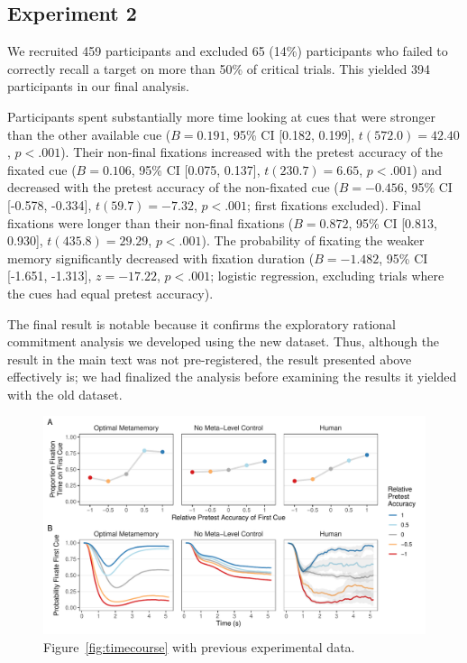 \subsection{Experiment 2}

We recruited 459 participants and excluded 65 (14\%) participants who failed to correctly recall a target on more than 50\% of critical trials. This yielded 394 participants in our final analysis.

Participants spent substantially more time looking at cues that were stronger than the other available cue ($B = 0.191$, 95\% CI [0.182, 0.199], $t(572.0)=42.40$, $p < .001$). Their non-final fixations increased with the pretest accuracy of the fixated cue ($B = 0.106$, 95\% CI [0.075, 0.137], $t(230.7)=6.65$, $p < .001$) and decreased with the pretest accuracy of the non-fixated cue ($B = -0.456$, 95\% CI [-0.578, -0.334], $t(59.7)=-7.32$, $p < .001$; first fixations excluded). Final fixations were longer than their non-final fixations ($B = 0.872$, 95\% CI [0.813, 0.930], $t(435.8)=29.29$, $p < .001$). The probability of fixating the weaker memory significantly decreased with fixation duration ($B = -1.482$, 95\% CI [-1.651, -1.313], $z=-17.22$, $p < .001$; logistic regression, excluding trials where the cues had equal pretest accuracy). 

The final result is notable because it confirms the exploratory rational commitment analysis we developed using the new dataset. Thus, although the result in the main text was not pre-registered, the result presented above effectively is; we had finalized the analysis before examining the results it yielded with the old dataset.

\begin{figure}[ht]
  \centering
  \includegraphics[scale=.75]{figs/memory/old_exp2/overall_timecourse.pdf}
  \caption{Figure~\ref{fig:timecourse} with previous experimental data.
    \label{fig:old_timecourse}
  }
\end{figure}

